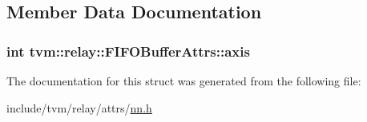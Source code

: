 \subsection{Member Data Documentation}
\subsubsection[{\texorpdfstring{axis}{axis}}]{\setlength{\rightskip}{0pt plus 5cm}int tvm\+::relay\+::\+F\+I\+F\+O\+Buffer\+Attrs\+::axis}\hypertarget{structtvm_1_1relay_1_1FIFOBufferAttrs_a6bcca24d09e7e35ef21863fff09a8385}{}\label{structtvm_1_1relay_1_1FIFOBufferAttrs_a6bcca24d09e7e35ef21863fff09a8385}


The documentation for this struct was generated from the following file\+:\begin{DoxyCompactItemize}
\item 
include/tvm/relay/attrs/\hyperlink{include_2tvm_2relay_2attrs_2nn_8h}{nn.\+h}\end{DoxyCompactItemize}
